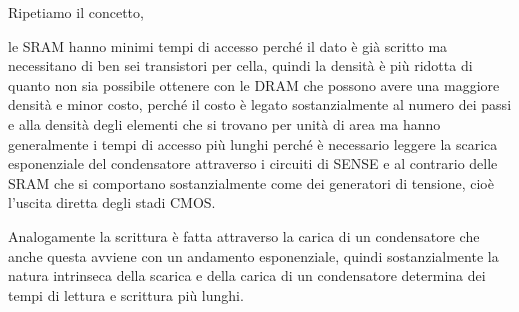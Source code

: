 Ripetiamo il concetto, 

le SRAM hanno minimi tempi di accesso perché il dato è già scritto ma necessitano di ben sei transistori per cella, quindi la densità è più ridotta di quanto non sia possibile ottenere con le DRAM che possono avere una maggiore densità e minor costo, perché il costo è legato sostanzialmente al numero dei passi e alla densità degli elementi che si trovano per unità di area ma hanno generalmente i tempi di accesso più lunghi perché è necessario leggere la scarica esponenziale del condensatore attraverso i circuiti di SENSE e al contrario delle SRAM che si comportano sostanzialmente come dei generatori di tensione, cioè l'uscita diretta degli stadi CMOS.

Analogamente la scrittura è fatta attraverso la carica di un condensatore che anche questa avviene con un andamento esponenziale, quindi sostanzialmente la natura intrinseca della scarica e della carica di un condensatore determina dei tempi di lettura e scrittura più lunghi.

